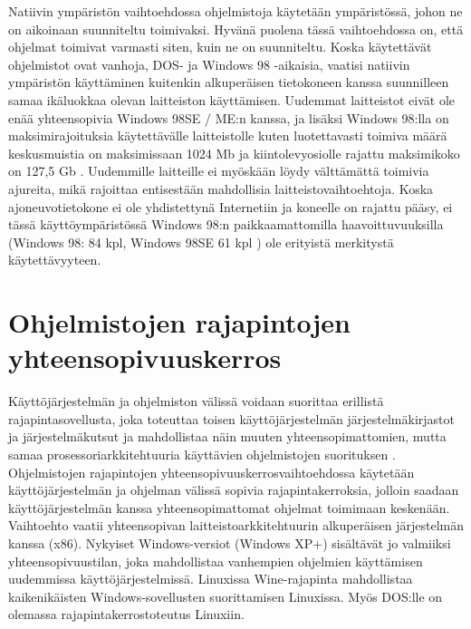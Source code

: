

Natiivin ympäristön vaihtoehdossa ohjelmistoja käytetään ympäristössä, johon ne on aikoinaan suunniteltu toimivaksi. Hyvänä puolena tässä vaihtoehdossa on, että ohjelmat toimivat varmasti siten, kuin ne on suunniteltu. Koska käytettävät ohjelmistot ovat vanhoja, DOS- ja Windows 98 -aikaisia, vaatisi natiivin ympäristön käyttäminen kuitenkin alkuperäisen tietokoneen kanssa suunnilleen samaa ikäluokkaa olevan laitteiston käyttämisen. Uudemmat laitteistot eivät ole enää yhteensopivia Windows 98SE / ME:n kanssa, ja lisäksi Windows 98:lla on maksimirajoituksia käytettävälle laitteistolle kuten luotettavasti toimiva määrä keskusmuistia on maksimissaan 1024 Mb ja kiintolevyosiolle rajattu maksimikoko on 127,5 Gb \cite{win98:maxspecs}. Uudemmille laitteille ei myöskään löydy välttämättä toimivia ajureita, mikä rajoittaa entisestään mahdollisia laitteistovaihtoehtoja. Koska ajoneuvotietokone ei ole yhdistettynä Internetiin ja koneelle on rajattu pääsy, ei tässä käyttöympäristössä Windows 98:n paikkaamattomilla haavoittuvuuksilla (Windows 98: 84 kpl, Windows 98SE 61 kpl \cite{win98:vulns}) ole erityistä merkitystä käytettävyyteen.

\section{Ohjelmistojen rajapintojen yhteensopivuuskerros}
Käyttöjärjestelmän ja ohjelmiston välissä voidaan suorittaa erillistä rajapintasovellusta, joka toteuttaa toisen käyttöjärjestelmän järjestelmäkirjastot ja järjestelmäkutsut ja mahdollistaa näin muuten yhteensopimattomien, mutta samaa prosessoriarkkitehtuuria käyttävien ohjelmistojen suorituksen \cite{ntvdm_kb}. Ohjelmistojen rajapintojen yhteensopivuuskerrosvaihtoehdossa käytetään käyttöjärjestelmän ja ohjelman välissä sopivia rajapintakerroksia, jolloin saadaan käyttöjärjestelmän kanssa yhteensopimattomat ohjelmat toimimaan keskenään. Vaihtoehto vaatii yhteensopivan laitteistoarkkitehtuurin alkuperäisen järjestelmän kanssa (x86). Nykyiset Windows-versiot (Windows XP+) sisältävät jo valmiiksi yhteensopivuustilan, joka mahdollistaa vanhempien ohjelmien käyttämisen uudemmissa käyttöjärjestelmissä. Linuxissa Wine-rajapinta mahdollistaa kaikenikäisten Windows-sovellusten suorittamisen Linuxissa. Myös DOS:lle on olemassa rajapintakerrostoteutus Linuxiin.

